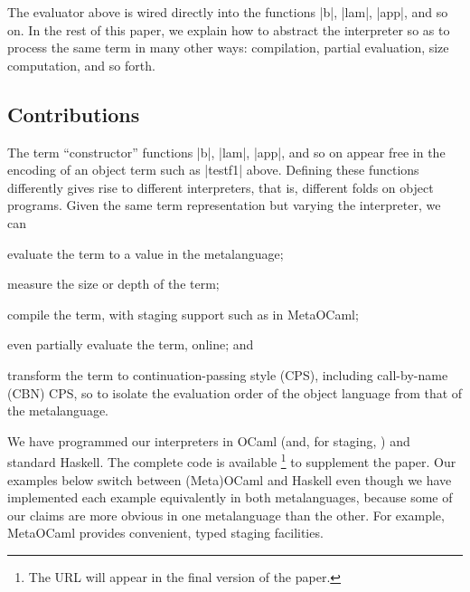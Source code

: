 \documentclass[preprint]{sigplanconf}
\begin{document}
The evaluator above is wired directly into the
functions |b|, |lam|, |app|, and so on.  In the rest of this paper, 
we explain how to abstract the interpreter so as
to process the same term in many other
ways: compilation, partial evaluation, size
computation, and so forth.

\subsection{Contributions}\label{contributions}

The term ``constructor'' functions |b|, |lam|, |app|, and so on appear
free in the encoding of an object term such as |testf1| above.  Defining
these functions differently gives rise to different interpreters, that
is, different folds on object programs.  Given the same term
representation but varying the interpreter, we can
\begin{itemize*}
    \item evaluate the term to a value in the metalanguage;
    \item measure the size or depth of the term;
    \item compile the term, with staging support such as in MetaOCaml;
    \item even partially evaluate the term, online; and
    \item transform the term to continuation\hyp passing style (CPS),
        including call-by-name (CBN) CPS, so to isolate the evaluation
        order of the object language from that of the metalanguage.
\end{itemize*}
We have programmed our interpreters in OCaml (and, for staging,
\citet{metaocaml}) and standard Haskell. The complete code is available%
\footnote{The URL will appear in the final version of the paper.}
to supplement the paper. Our examples below switch between (Meta)OCaml
and Haskell even though we have implemented each example equivalently in
both metalanguages, because some of our claims are more obvious in one
metalanguage than the other.  For example, MetaOCaml provides
convenient, typed staging facilities.
\end{document}
